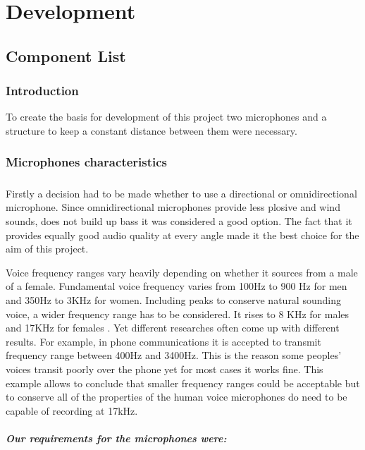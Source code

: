 \chapter{Development}\label{ch:development}
\section{Component List}
\subsection{Introduction}
To create the basis for development of this project two microphones and a structure to keep a constant distance between them were necessary.  

\subsection{Microphones characteristics}
\paragraph{}
Firstly a decision had to be made whether to use a directional or omnidirectional microphone. Since omnidirectional microphones provide less plosive and wind sounds, does not build up bass it was considered a good option. The fact that it provides equally good audio quality at every angle made it the best choice for the aim of this project.

Voice frequency ranges vary heavily depending on whether it sources from a male of a female. Fundamental voice frequency varies from 100Hz to 900 Hz for men and 350Hz to 3KHz for women. Including peaks to conserve natural sounding voice, a wider frequency range has to be considered. It rises to 8 KHz for males and 17KHz for females \cite{Seaindia}. Yet different researches often come up with different results. For example, in phone communications it is accepted to transmit frequency range between 400Hz and 3400Hz. This is the reason some peoples' voices transit poorly over the phone yet for most cases it works fine. This example allows to conclude that smaller frequency ranges could be acceptable but to conserve all of the properties of the human voice microphones do need to be capable of recording at 17kHz. 
\paragraph{Our requirements for the microphones were: \\}

